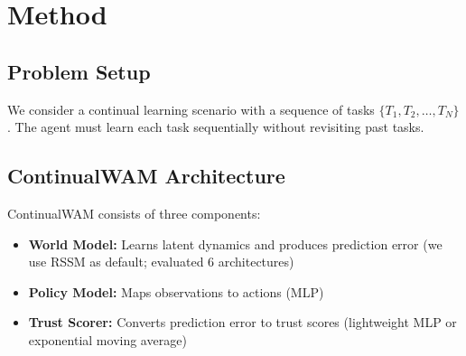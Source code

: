 \documentclass{article}
\begin{document}
\section{Method}

\subsection{Problem Setup}

We consider a continual learning scenario with a sequence of tasks $\{T_1, T_2, \ldots, T_N\}$. The agent must learn each task sequentially without revisiting past tasks.

\subsection{ContinualWAM Architecture}

ContinualWAM consists of three components:
\begin{itemize}
\item \textbf{World Model:} Learns latent dynamics and produces prediction error (we use RSSM as default; evaluated 6 architectures)
\item \textbf{Policy Model:} Maps observations to actions (MLP)
\item \textbf{Trust Scorer:} Converts prediction error to trust scores (lightweight MLP or exponential moving average)
\end{itemize}
\end{document}
